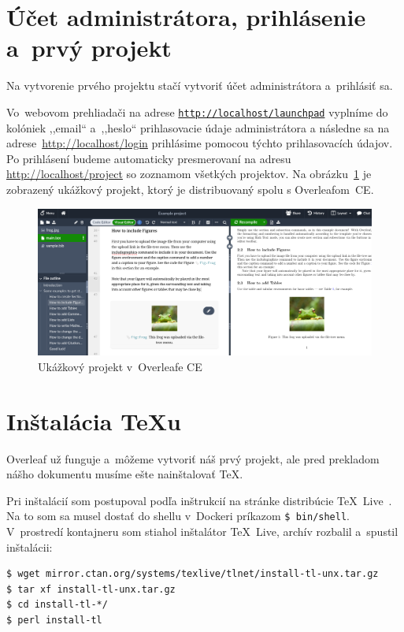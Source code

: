 \documentclass{csbulletin}
\begin{document}
\vspace*{-1em}
\section{Účet administrátora, prihlásenie a~prvý projekt}
\vspace*{-0.5em}

Na vytvorenie prvého projektu stačí vytvoriť účet administrátora a~prihlásiť sa.

Vo~webovom prehliadači na adrese \href{http://localhost/launchpad}{\lstinline{http://localhost/launchpad}} vyplníme do kolóniek ,,email`` a~,,heslo`` prihlasovacie údaje administrátora a následne sa na adrese~\url{http://localhost/login} prihlásime pomocou týchto prihlasovacích údajov. Po prihlásení budeme automaticky presmerovaní na adresu \url{http://localhost/project} so zoznamom všetkých projektov. Na obrázku~\ref{fig:example-project} je zobrazený ukážkový projekt, ktorý je distribuovaný spolu s Overleafom~CE.

\begin{figure}[b!]
    \vspace*{-0.5em}
    \centering
    \includegraphics[width=\textwidth]{example-project}
    \par
    \vspace*{-0.5em}
    \caption{Ukážkový projekt v~Overleafe CE}
    \label{fig:example-project}
\end{figure}

\iffalse

\section{Inštalácia \TeX u}
Overleaf už funguje a~môžeme vytvoriť náš prvý projekt, ale pred prekladom nášho dokumentu musíme ešte nainštalovať \TeX.

Pri inštalácií som postupoval podľa inštrukcií na stránke distribúcie \TeX~Live~\cite{texlive}. Na to som sa musel dostať do shellu v~Dockeri príkazom \lstinline{$ bin/shell}. V~prostredí kontajneru som stiahol inštalátor \TeX~Live, archív rozbalil a~spustil inštalácii:
\begin{lstlisting}
$ wget mirror.ctan.org/systems/texlive/tlnet/install-tl-unx.tar.gz
$ tar xf install-tl-unx.tar.gz
$ cd install-tl-*/
$ perl install-tl
\end{lstlisting}
\end{document}
